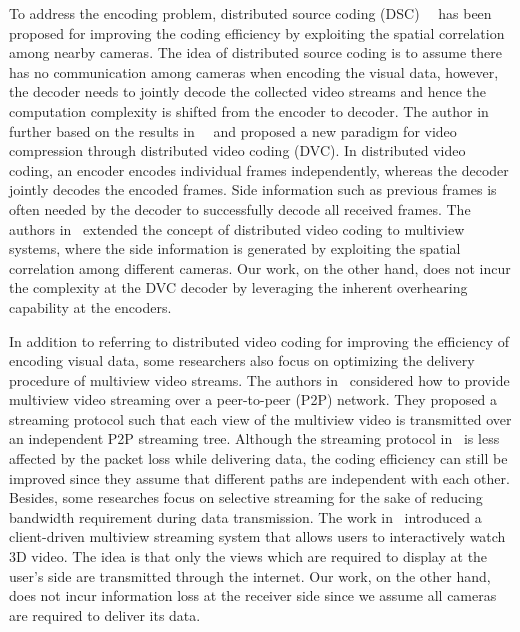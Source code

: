 To address the encoding problem, distributed source coding (DSC)~\cite{SlepianWolf}~\cite{WynerZiv} has been proposed for improving the coding efficiency by exploiting the spatial correlation among nearby cameras.
The idea of distributed source coding is to assume there has no communication among cameras when encoding the visual data, however, the decoder needs to jointly decode the collected video streams and hence the computation complexity is shifted from the encoder to decoder.
The author in~\cite{DVC} further based on the results in~\cite{SlepianWolf}~\cite{WynerZiv} and proposed a new paradigm for video compression through distributed video coding (DVC).
In distributed video coding, an encoder encodes individual frames independently, whereas the decoder jointly decodes the encoded frames.
Side information such as previous frames is often needed by the decoder to successfully decode all received frames.
The authors in~\cite{DVCinMVC} extended the concept of distributed video coding to multiview systems, where the side information is generated by exploiting the spatial correlation among different cameras.
Our work, on the other hand, does not incur the complexity at the DVC decoder by leveraging the inherent overhearing capability at the encoders.

In addition to referring to distributed video coding for improving the efficiency of encoding visual data, some researchers also focus on optimizing the delivery procedure of multiview video streams.
The authors in~\cite{P2Pstreaming} considered how to provide multiview video streaming over a peer-to-peer (P2P) network.
They proposed a streaming protocol such that each view of the multiview video is transmitted over an independent P2P streaming tree.
Although the streaming protocol in~\cite{P2Pstreaming} is less affected by the packet loss while delivering data, the coding efficiency can still be improved since they assume that different paths are independent with each other.
Besides, some researches focus on selective streaming for the sake of reducing bandwidth requirement during data transmission.
The work in~\cite{ClientDrivenStreaming} introduced a client-driven multiview streaming system that allows users to interactively watch 3D video.
The idea is that only the views which are required to display at the user's side are transmitted through the internet.
Our work, on the other hand, does not incur information loss at the receiver side since we assume all cameras are required to deliver its data.

